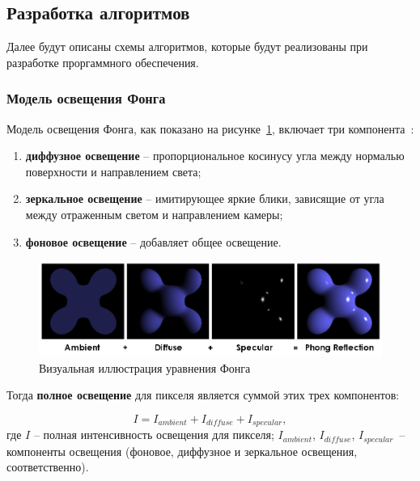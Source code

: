 \subsection{Разработка алгоритмов}

Далее будут описаны схемы алгоритмов, которые будут реализованы при разработке проргаммного обеспечения.

\subsubsection{Модель освещения Фонга}

Модель освещения Фонга, как показано на рисунке~\ref{fig:0}, включает три компонента~\cite{phong1975illumination}:

\begin{enumerate}[label=\arabic*)]
	\item \textbf{диффузное освещение} -- пропорциональное косинусу угла между нормалью поверхности и направлением света;
	\item \textbf{зеркальное освещение} -- имитирующее яркие блики, зависящие от угла между отраженным светом и направлением камеры;
	\item \textbf{фоновое освещение} -- добавляет общее освещение.
\end{enumerate}

\begin{figure}[ht!]
	\begin{center}
		\includegraphics[scale=0.65]{img/phong.png}
	\end{center}
	\caption{Визуальная иллюстрация уравнения Фонга}
	\label{fig:0}
\end{figure}


Тогда \textbf{полное освещение} для пикселя является суммой этих трех компонентов:

\begin{equation}
	I = I_{ambient} + I_{diffuse} + I_{specular},
\end{equation}
где $I$ -- полная интенсивность освещения для пикселя;  $I_{ambient}$, $I_{diffuse}$, $I_{specular}$~-- компоненты освещения (фоновое, диффузное и зеркальное освещения, соответственно).

